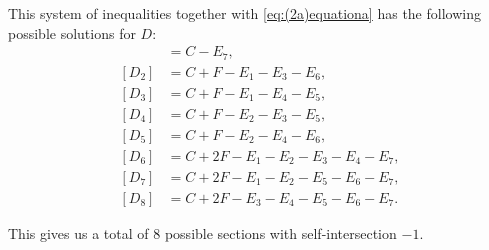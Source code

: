 \documentclass[a4paper, 11pt, reqno]{amsart}
\numberwithin{equation}{section} \numberwithin{figure}{section}
\theoremstyle{definition}
\numberwithin{lemma}{section}
\begin{document}
This system of inequalities together with \eqref{eq:(2a)equationa} has the following possible solutions for $D$:
\begin{align*}
    [D_1] &= C - E_7,\\
    [D_2] &= C + F - E_1 - E_3 - E_6,\\
    [D_3] &= C + F - E_1 - E_4 - E_5,\\
    [D_4] &= C + F - E_2 - E_3 - E_5,\\
    [D_5] &= C + F - E_2 - E_4 - E_6,\\
    [D_6] &= C + 2F - E_1 - E_2 - E_3 - E_4 - E_7,\\
    [D_7] &= C + 2F - E_1 - E_2 - E_5 - E_6 - E_7,\\
    [D_8] &= C + 2F - E_3 - E_4 - E_5 - E_6 - E_7.
\end{align*}

This gives us a total of 8 possible sections with self-intersection $-1$. 
\end{document}
